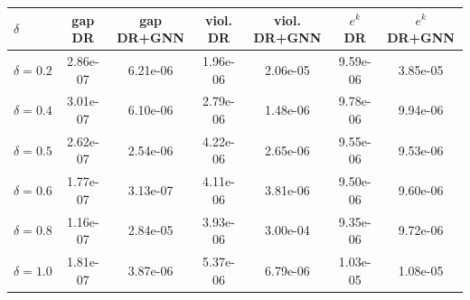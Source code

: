 
\begin{tabular}{lcccccc}
\toprule
$\delta$ & gap DR & gap DR+GNN & viol. DR & viol. DR+GNN & $e^k$ DR & $e^k$ DR+GNN \\
\midrule
$\delta=0.2$ & 2.86e-07 & 6.21e-06 & 1.96e-06 & 2.06e-05 & 9.59e-06 & 3.85e-05 \\
$\delta=0.4$ & 3.01e-07 & 6.10e-06 & 2.79e-06 & 1.48e-06 & 9.78e-06 & 9.94e-06 \\
$\delta=0.5$ & 2.62e-07 & 2.54e-06 & 4.22e-06 & 2.65e-06 & 9.55e-06 & 9.53e-06 \\
$\delta=0.6$ & 1.77e-07 & 3.13e-07 & 4.11e-06 & 3.81e-06 & 9.50e-06 & 9.60e-06 \\
$\delta=0.8$ & 1.16e-07 & 2.84e-05 & 3.93e-06 & 3.00e-04 & 9.35e-06 & 9.72e-06 \\
$\delta=1.0$ & 1.81e-07 & 3.87e-06 & 5.37e-06 & 6.79e-06 & 1.03e-05 & 1.08e-05 \\
\bottomrule
\end{tabular}
